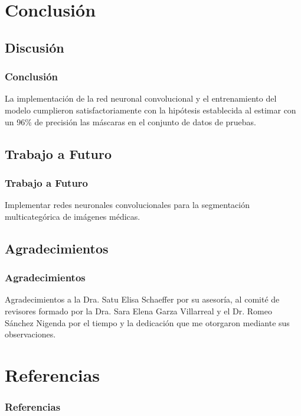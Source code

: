 \documentclass{beamer}
\begin{document}
\section{Conclusión}
\subsection{Discusión}
\begin{frame}
    \frametitle{Conclusión}
    La implementación de la red neuronal convolucional y el entrenamiento del modelo cumplieron satisfactoriamente con la hipótesis establecida al estimar con un 96\% de precisión las máscaras en el conjunto de datos de pruebas.
\end{frame}

\subsection{Trabajo a Futuro}
\begin{frame}
    \frametitle{Trabajo a Futuro}
    Implementar redes neuronales convolucionales para la segmentación multicategórica de imágenes médicas.
\end{frame}

\subsection{Agradecimientos}
\begin{frame}
    \frametitle{Agradecimientos}
    Agradecimientos a la Dra. Satu Elisa Schaeffer por su asesoría, al comité de revisores formado por la Dra. Sara Elena Garza Villarreal y el Dr. Romeo Sánchez Nigenda por el tiempo y la dedicación que me otorgaron mediante sus observaciones.
\end{frame}

\section{Referencias}
\begin{frame}[allowframebreaks]
    \footnotesize
    \nocite{adam_opt}
    \frametitle{Referencias}
    
    
    
    
\end{frame}
\end{document}
